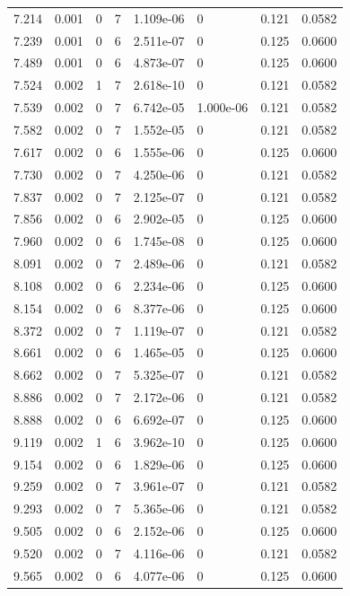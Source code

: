 \documentclass[preview]{standalone}
\begin{document}
{{{\begin{tabular}{L{1.2cm}C{1.2cm} C{0.3cm}C{0.5cm} C{1.4cm}C{1.4cm} C{1.4cm}C{1.4cm}}
  7.214  &  0.001  & 0     &  7 &  1.109e-06  & 0  & 0.121 &  0.0582   \\ 
  7.239  &  0.001  & 0     &  6 &  2.511e-07  & 0  & 0.125 &  0.0600   \\ 
  7.489  &  0.001  & 0     &  6 &  4.873e-07  & 0  & 0.125 &  0.0600   \\ 
  7.524  &  0.002  & 1     &  7 &  2.618e-10  & 0  & 0.121 &  0.0582   \\ 
  7.539  &  0.002  & 0     &  7 &  6.742e-05  & 1.000e-06  & 0.121 &  0.0582   \\ 
  7.582  &  0.002  & 0     &  7 &  1.552e-05  & 0  & 0.121 &  0.0582   \\ 
  7.617  &  0.002  & 0     &  6 &  1.555e-06  & 0  & 0.125 &  0.0600   \\ 
  7.730  &  0.002  & 0     &  7 &  4.250e-06  & 0  & 0.121 &  0.0582   \\ 
  7.837  &  0.002  & 0     &  7 &  2.125e-07  & 0  & 0.121 &  0.0582   \\ 
  7.856  &  0.002  & 0     &  6 &  2.902e-05  & 0  & 0.125 &  0.0600   \\ 
  7.960  &  0.002  & 0     &  6 &  1.745e-08  & 0  & 0.125 &  0.0600   \\ 
  8.091  &  0.002  & 0     &  7 &  2.489e-06  & 0  & 0.121 &  0.0582   \\ 
  8.108  &  0.002  & 0     &  6 &  2.234e-06  & 0  & 0.125 &  0.0600   \\ 
  8.154  &  0.002  & 0     &  6 &  8.377e-06  & 0  & 0.125 &  0.0600   \\ 
  8.372  &  0.002  & 0     &  7 &  1.119e-07  & 0  & 0.121 &  0.0582   \\ 
  8.661  &  0.002  & 0     &  6 &  1.465e-05  & 0  & 0.125 &  0.0600   \\ 
  8.662  &  0.002  & 0     &  7 &  5.325e-07  & 0  & 0.121 &  0.0582   \\ 
  8.886  &  0.002  & 0     &  7 &  2.172e-06  & 0  & 0.121 &  0.0582   \\ 
  8.888  &  0.002  & 0     &  6 &  6.692e-07  & 0  & 0.125 &  0.0600   \\ 
  9.119  &  0.002  & 1     &  6 &  3.962e-10  & 0  & 0.125 &  0.0600   \\ 
  9.154  &  0.002  & 0     &  6 &  1.829e-06  & 0  & 0.125 &  0.0600   \\ 
  9.259  &  0.002  & 0     &  7 &  3.961e-07  & 0  & 0.121 &  0.0582   \\ 
  9.293  &  0.002  & 0     &  7 &  5.365e-06  & 0  & 0.121 &  0.0582   \\ 
  9.505  &  0.002  & 0     &  6 &  2.152e-06  & 0  & 0.125 &  0.0600   \\ 
  9.520  &  0.002  & 0     &  7 &  4.116e-06  & 0  & 0.121 &  0.0582   \\ 
  9.565  &  0.002  & 0     &  6 &  4.077e-06  & 0  & 0.125 &  0.0600   \\ 
\hline 
\end{tabular} 

}}}
\end{document}
